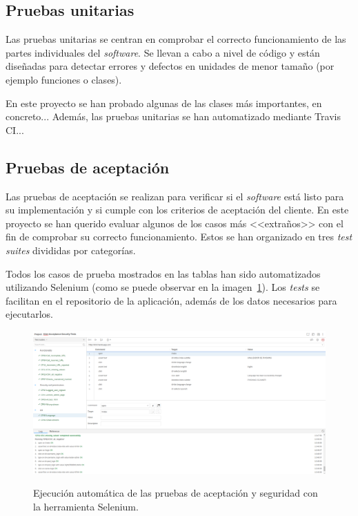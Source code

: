 \subsection{Pruebas unitarias}
\label{s:pruebas-unitarias}

Las pruebas unitarias se centran en comprobar el correcto funcionamiento de las partes individuales del \textit{software}. Se llevan a cabo a nivel de código y están diseñadas para detectar errores y defectos en unidades de menor tamaño (por ejemplo funciones o clases).

En este proyecto se han probado algunas de las clases más importantes, en concreto... Además, las pruebas unitarias se han automatizado mediante Travis CI...


\subsection{Pruebas de aceptación}
\label{s:pruebas-aceptación}

Las pruebas de aceptación se realizan para verificar si el \textit{software} está listo para su implementación y si cumple con los criterios de aceptación del cliente. En este proyecto se han querido evaluar algunos de los casos más <<extraños>> con el fin de comprobar su correcto funcionamiento. Estos se han organizado en tres \textit{test suites} divididas por categorías.

Todos los casos de prueba mostrados en las tablas han sido automatizados utilizando Selenium (como se puede observar en la imagen~\ref{cp:selenium}). Los \textit{tests} se facilitan en el repositorio de la aplicación, además de los datos necesarios para ejecutarlos.

\begin{figure}[h]
	\caption[Selenium: ejecución automática de \textit{tests}]{Ejecución automática de las pruebas de aceptación y seguridad con la herramienta Selenium.}
	\centering
	\includegraphics[width=\textwidth]{../img/anexos/cp/selenium-tests}
	\label{cp:selenium}
\end{figure}

